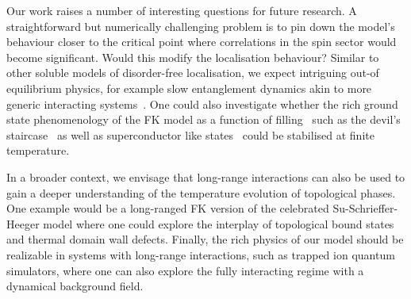 Our work raises a number of interesting questions for future research. A straightforward but numerically challenging problem is to pin down the model's behaviour closer to the critical point where correlations in the spin sector would become significant. Would this modify the localisation behaviour? Similar to other soluble models of disorder-free localisation, we expect intriguing out-of equilibrium physics, for example slow entanglement dynamics akin to more generic interacting systems~\autocite{hartLogarithmicEntanglementGrowth2020}. One could also investigate whether the rich ground state phenomenology of the FK model as a function of filling~\autocite{gruberGroundStatesSpinless1990} such as the devil's staircase~\autocite{michelettiCompleteDevilTextquotesingles1997} as well as superconductor like states~\autocite{caiVisualizingEvolutionMott2016} could be stabilised at finite temperature.

In a broader context, we envisage that long-range interactions can also be used to gain a deeper understanding of the temperature evolution of topological phases. One example would be a long-ranged FK version of the celebrated Su-Schrieffer-Heeger model where one could explore the interplay of topological bound states and thermal domain wall defects. Finally, the rich physics of our model should be realizable in systems with long-range interactions, such as trapped ion quantum simulators, where one can also explore the fully interacting regime with a dynamical background field.
